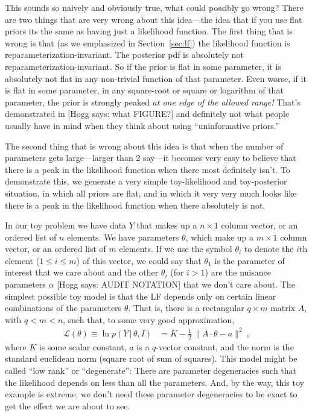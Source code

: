 \documentclass{article}
\newcommand{\sectionname}{Section}
\newcommand{\secref}[1]{\sectionname~\ref{#1}}
\newcommand{\given}{\,|\,}
\newcommand{\norm}[1]{\lVert{#1}\rVert}
\newcommand{\hogg}[1]{{\color{blue}[Hogg says: {#1}]}}
\begin{document}
This sounds so naively and obviously true, what could possibly go wrong?
There are two things that are very wrong about this idea---the idea that if you use flat priors its the same as having just a likelihood function.
The first thing that is wrong is that (as we emphasized in \secref{sec:lf}) the likelihood function is reparameterization-invariant.
The posterior pdf is absolutely not reparameterization-invariant.
So if the prior is flat in some parameter, it is absolutely not flat in any non-trivial function of that parameter.
Even worse, if it is flat in some parameter, in any square-root or square or logarithm of that parameter, the prior is strongly peaked \emph{at one edge of the allowed range!}
That's demonstrated in \hogg{what FIGURE?} and definitely not what people usually have in mind when they think about using ``uninformative priors.''

The second thing that is wrong about this idea is that when the number of parameters gets large---larger than 2 say---it becomes very easy to believe that there is a peak in the likelihood function when there most definitely isn't.
To demonstrate this, we generate a very simple toy-likelihood and toy-posterior situation, in which all priors are flat, and in which it very very much looks like there is a peak in the likelihood function when there absolutely is not.

In our toy problem we have data $Y$ that makes up a $n\times 1$ column vector, or an ordered list of $n$ elements.
We have parameters $\theta$, which make up a $m\times 1$ column vector, or an ordered list of $m$ elements.
If we use the symbol $\theta_i$ to denote the $i$th element ($1\leq i\leq m$) of this vector, we could say that $\theta_1$ is the parameter of interest that we care about and the other $\theta_i$ (for $i>1$) are the nuisance parameters $\alpha$ \hogg{AUDIT NOTATION} that we don't care about.
The simplest possible toy model is that the LF depends only on certain linear combinations of the parameters $\theta$.
That is, there is a rectangular $q\times m$ matrix $A$, with $q<m<n$, such that, to some very good approximation,
\begin{align}
    \mathscr{L}(\theta) \equiv \ln p(Y\given\theta,I) &= K - \frac{1}{2}\,\norm{A\cdot\theta - a}^2 ~,\label{eq:toyLF}
\end{align}
where $K$ is some scalar constant, $a$ is a $q$-vector constant, and the norm is the standard euclidean norm (square root of sum of squares).
This model might be called ``low rank'' or ``degenerate'':
There are parameter degeneracies such that the likelihood depends on less than all the parameters.
And, by the way, this toy example is extreme; we don't need these parameter degeneracies to be exact to get the effect we are about to see.
\end{document}
